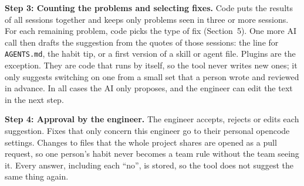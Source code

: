 \documentclass[10pt,twocolumn]{article}
\begin{document}
\begin{center}
\label{fig:timeline}
\end{center}

\textbf{Step 3: Counting the problems and selecting fixes.} Code puts the results of all sessions together and keeps only problems seen in three or more sessions. For each remaining problem, code picks the type of fix (Section~5). One more AI call then drafts the suggestion from the quotes of those sessions: the line for \texttt{AGENTS.md}, the habit tip, or a first version of a skill or agent file. Plugins are the exception. They are code that runs by itself, so the tool never writes new ones; it only suggests switching on one from a small set that a person wrote and reviewed in advance. In all cases the AI only proposes, and the engineer can edit the text in the next step.

\textbf{Step 4: Approval by the engineer.} The engineer accepts, rejects or edits each suggestion. Fixes that only concern this engineer go to their personal opencode settings. Changes to files that the whole project shares are opened as a pull request, so one person's habit never becomes a team rule without the team seeing it. Every answer, including each ``no'', is stored, so the tool does not suggest the same thing again.
\end{document}
